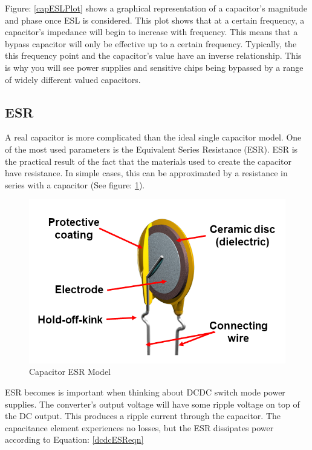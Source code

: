 Figure: \ref{capESLPlot} shows a graphical representation of a capacitor's magnitude and phase once ESL is considered. This plot shows that at a certain frequency, a capacitor's impedance will begin to increase with frequency. This means that a bypass capacitor will only be effective up to a certain frequency. Typically, the this frequency point and the capacitor's value have an inverse relationship. This is why you will see power supplies and sensitive chips being bypassed by a range of widely different valued capacitors. 

\subsection{ESR}
A real capacitor is more complicated than the ideal single capacitor model. One of the most used parameters is the Equivalent Series Resistance (ESR). ESR is the practical result of the fact that the materials used to create the capacitor have resistance. In simple cases, this can be approximated by a resistance in series with a capacitor (See figure: \ref{capESRModelFig}).

\begin{figure}
    \includegraphics[keepaspectratio=true,scale=.5]{./figures/testImage.png}
    \centering
    \caption{Capacitor ESR Model}
    \label{capESRModelFig}
\end{figure}

ESR becomes is important when thinking about DCDC switch mode power supplies. The converter's output voltage will have some ripple voltage on top of the DC output. This produces a ripple current through the capacitor. The capacitance element experiences no losses, but the ESR dissipates power according to Equation: \eqref{dcdcESReqn}

